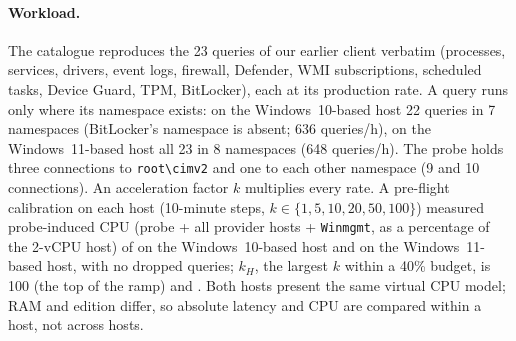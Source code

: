 \documentclass[letterpaper,twocolumn,10pt]{article}
\newcommand{\code}[1]{\texttt{\small #1}}
\begin{document}
\paragraph{Workload.}
The catalogue reproduces the 23 queries of our earlier client verbatim (processes, services, drivers, event logs, firewall, Defender, WMI subscriptions, scheduled tasks, Device Guard, TPM, BitLocker), each at its production rate.
A query runs only where its namespace exists: on the Windows~10-based host 22 queries in 7 namespaces (BitLocker's namespace is absent; 636 queries/h), on the Windows~11-based host all 23 in 8 namespaces (648 queries/h).
The probe holds three connections to \code{root\textbackslash cimv2} and one to each other namespace (9 and 10 connections).
An acceleration factor $k$ multiplies every rate.
A pre-flight calibration on each host (10-minute steps, $k\in\{1,5,10,20,50,100\}$) measured probe-induced CPU (probe + all provider hosts + \code{Winmgmt}, as a percentage of the 2-vCPU host) of \WaRamp{} on the Windows~10-based host and \WcRamp{} on the Windows~11-based host, with no dropped queries; $k_H$, the largest $k$ within a 40\% budget, is 100 (the top of the ramp) and \WcK{}.
Both hosts present the same virtual CPU model; RAM and edition differ, so absolute latency and CPU are compared within a host, not across hosts.
\end{document}

